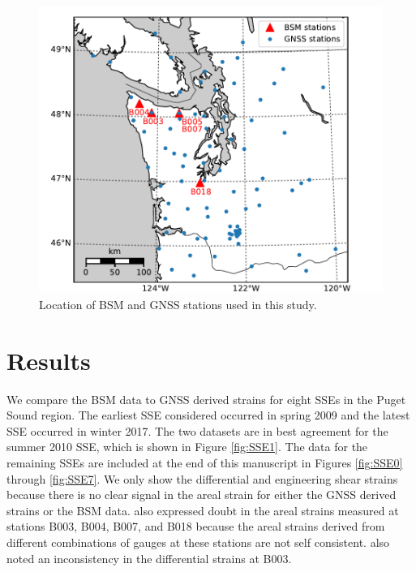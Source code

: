 \documentclass[10pt,a4paper]{article}
\begin{document}
\begin{figure}
\includegraphics{figures/map.pdf}
\caption{Location of BSM and GNSS stations used in this study.}   
\label{fig:Map}
\end{figure}

\section{Results}
We compare the BSM data to GNSS derived strains for eight SSEs in the Puget Sound region. The earliest SSE considered occurred in spring 2009 and the latest SSE occurred in winter 2017. The two datasets are in best agreement for the summer 2010 SSE, which is shown in Figure \ref{fig:SSE1}. The data for the remaining SSEs are included at the end of this manuscript in Figures \ref{fig:SSE0} through \ref{fig:SSE7}. We only show the differential and engineering shear strains because there is no clear signal in the areal strain for either the GNSS derived strains or the BSM data. \citet{Roeloffs2010} also expressed doubt in the areal strains measured at stations B003, B004, B007, and B018 because the areal strains derived from different combinations of gauges at these stations are not self consistent. \citet{Roeloffs2010} also noted an inconsistency in the differential strains at B003. 
\end{document}
